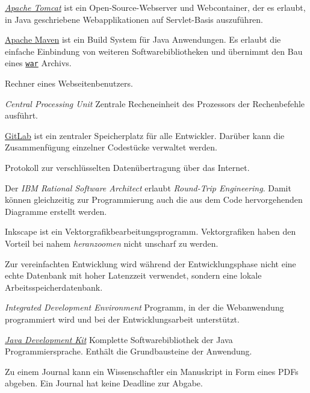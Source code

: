 
\begin{description}

	 \href{http://tomcat.apache.org/}{\emph{Apache Tomcat}} ist ein Open-Source-Webserver und Webcontainer, der es erlaubt, in Java geschriebene Webapplikationen auf Servlet-Basis auszuführen.

	 \href{https://maven.apache.org/what-is-maven.html}{Apache Maven} ist ein Build System für Java Anwendungen. Es erlaubt die einfache Einbindung von weiteren Softwarebibliotheken und übernimmt den Bau eines \hyperref[glo:war]{\texttt{war}} Archivs.

	 Rechner eines Webseitenbenutzers.

	 \emph{Central Processing Unit} Zentrale Recheneinheit des Prozessors der Rechenbefehle ausführt.

	 \href{https://fimgit.fim.uni-passau.de/users/sign_in}{GitLab} ist ein zentraler Speicherplatz für alle Entwickler. Darüber kann die Zusammenfügung einzelner Codestücke verwaltet werden.

	 Protokoll zur verschlüsselten Datenübertragung über das Internet.

	 Der \emph{IBM Rational Software Architect} erlaubt \emph{Round-Trip Engineering}. Damit können gleichzeitig zur Programmierung auch die aus dem Code hervorgehenden Diagramme erstellt werden.

	 Inkscape ist ein Vektorgrafikbearbeitungsprogramm. Vektorgrafiken haben den Vorteil bei nahem \emph{heranzoomen} nicht unscharf zu werden.

	 Zur vereinfachten Entwicklung wird während der Entwicklungsphase nicht eine echte Datenbank mit hoher Latenzzeit verwendet, sondern eine lokale Arbeitsspeicherdatenbank.

	 \emph{Integrated Development Environment} Programm, in der die Webanwendung programmiert wird und bei der Entwicklungsarbeit unterstützt.

	 \href{https://www.oracle.com/java/technologies/downloads/}{\emph{Java Development Kit}} Komplette Softwarebibliothek der Java Programmiersprache. Enthält die Grundbausteine der Anwendung.

	 Zu einem Journal kann ein Wissenschaftler ein Manuskript in Form eines PDFs abgeben. Ein Journal hat keine Deadline zur Abgabe.


\end{description}
